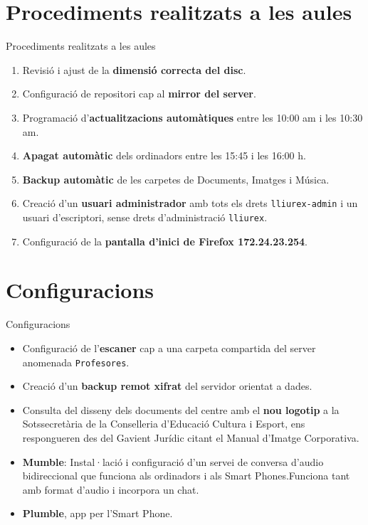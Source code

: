 \documentclass[xcolor=dvipsnames]{beamer}
\begin{document}
\section{Procediments realitzats a les aules}
\begin{frame}{Procediments realitzats a les aules}

  \begin{enumerate}
  \item<1->
    Revisió i ajust de la \textbf{dimensió correcta del disc}.
  \item<2->
    Configuració de repositori cap al \textbf{mirror del server}.
  \item<3->
    Programació d'\textbf{actualitzacions automàtiques} entre les 10:00 am i les 10:30 am.
  \item<4->
    \textbf{Apagat automàtic} dels ordinadors entre les 15:45 i les 16:00 h.
  \item<5->
    \textbf{Backup automàtic} de les carpetes de Documents, Imatges i Música.
  \item<6->
    Creació d'un \textbf{usuari administrador} amb tots els drets
    \texttt{lliurex-admin} i un usuari d'escriptori, sense drets
    d'administració \texttt{lliurex}.
  \item<7->
    Configuració de la \textbf{pantalla d'inici de Firefox 172.24.23.254}.
  \end{enumerate}
\end{frame}

\section{Configuracions}

\begin{frame}{Configuracions}

\begin{itemize}
\item<1->
  Configuració de l'\textbf{escaner} cap a una carpeta compartida del server
  anomenada \texttt{Profesores}.
\item<2->
  Creació d'un \textbf{backup remot xifrat} del servidor orientat a dades.
\item<3->
  Consulta del disseny dels documents del centre amb el \textbf{nou logotip} a la
  Sotssecretària de la Conselleria d'Educació Cultura i Esport, ens
  respongueren des del Gavient Jurídic citant el Manual d'Imatge
  Corporativa.
\item<4->
  \textbf{Mumble}: Instal·lació i configuració d'un servei de conversa
  d'audio bidireccional que funciona als ordinadors i als Smart
  Phones.Funciona tant amb format d'audio i incorpora un chat.
\item<5->
  \textbf{Plumble}, app per l'Smart Phone.
\end{itemize}
\end{frame}
\end{document}
